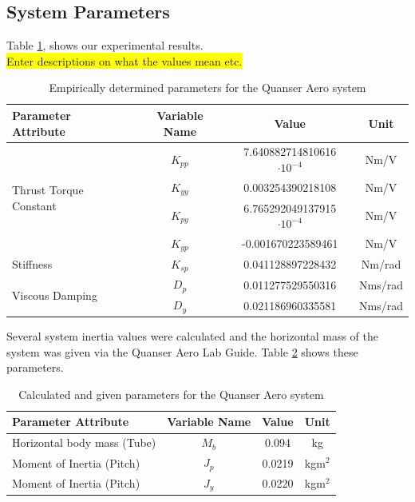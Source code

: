 \documentclass[11pt]{article}
\begin{document}
\subsection{System Parameters}\label{section:coefficients}
Table \ref{table:emp_params}, shows our experimental results.\\
\colorbox{yellow}{Enter descriptions on what the values mean etc.}
\begin{table}[H]
\begin{center}
\begin{tabular}{ |l|c|c|c| } 
    \hline
    \textbf{Parameter Attribute} & \textbf{Variable Name} & \textbf{Value} & \textbf{Unit} \\ 
    \hline
    \multirow{4}{4cm}{Thrust Torque Constant} 
    & $K_{pp}$ & 7.640882714810616$\cdot 10^{-4}$ & Nm/V\\ 
    & $K_{yy}$ & 0.003254390218108 & Nm/V\\ 
    & $K_{py}$ & 6.765292049137915$\cdot 10^{-4}$ & Nm/V\\
    & $K_{yp}$ & -0.001670223589461 & Nm/V\\
    \hline
    Stiffness & $K_{sp}$ & 0.041128897228432 & Nm/rad\\ 
    \hline
    \multirow{2}{4cm}{Viscous Damping} 
    & $D_{p}$ & 0.011277529550316 & Nms/rad\\ 
    & $D_{y}$ & 0.021186960335581 & Nms/rad\\ 
    \hline
\end{tabular}
\caption{Empirically determined parameters for the Quanser Aero system}\label{table:emp_params}
\end{center}
\end{table}
Several system inertia values were calculated and the horizontal mass of the system was given via the Quanser Aero Lab Guide. Table \ref{table:calc_params} shows these parameters. 
\begin{table}[H]
\begin{center}
\begin{tabular}{ |l|c|c|c| } 
    \hline
    \textbf{Parameter Attribute} & \textbf{Variable Name} & \textbf{Value} & \textbf{Unit} \\ 
    \hline
    Horizontal body mass (Tube) & $M_b$ & 0.094 & kg\\ 
    \hline
    Moment of Inertia (Pitch) & $J_p$ & 0.0219 & kg$\text{m}^2$\\ 
    \hline
    Moment of Inertia (Pitch) & $J_y$ & 0.0220 & kg$\text{m}^2$\\ 
    \hline
\end{tabular}
\caption{Calculated and given parameters for the Quanser Aero system}
\label{table:calc_params}
\end{center}
\end{table}
\end{document}
